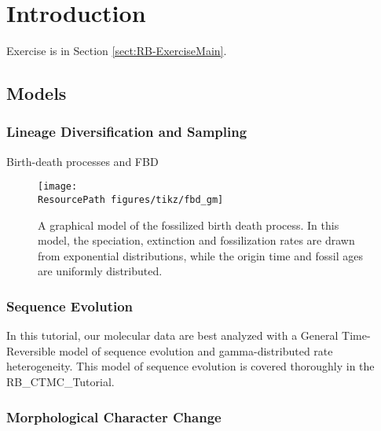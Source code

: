 
\section{Introduction}

\citet{Ronquist2012a} 

Exercise is in Section \ref{sect:RB-ExerciseMain}.

\subsection{Models}

\subsubsection{Lineage Diversification and Sampling}

Birth-death processes and FBD

\begin{figure}[h!]
\centering
\texttt{[image: \\ResourcePath figures/tikz/fbd\_gm]}
\caption{\small A graphical model of the fossilized birth death process. In this model, the speciation, extinction and fossilization rates are drawn from exponential distributions, while the origin time and fossil ages are uniformly distributed. }
\label{fig:fbd_gm}
\end{figure}


\subsubsection{Sequence Evolution}

In this tutorial, our molecular data are best analyzed with a General Time-Reversible model of sequence evolution and gamma-distributed rate heterogeneity. This model of sequence evolution is covered thoroughly in the RB\_CTMC\_Tutorial.

\subsubsection{Morphological Character Change}

